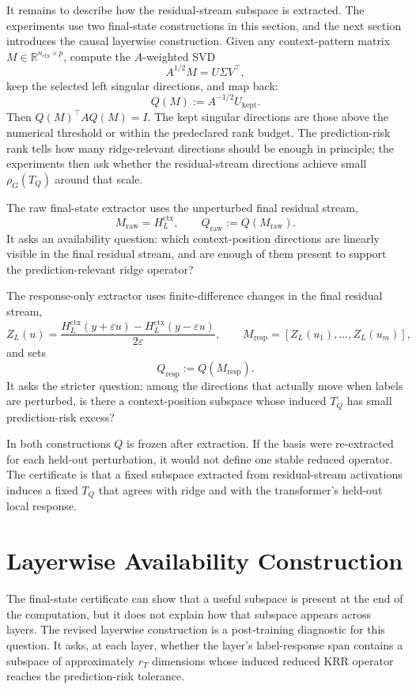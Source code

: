\documentclass[11pt]{article}
\newcommand{\R}{\mathbb{R}}
\begin{document}
It remains to describe how the residual-stream subspace is extracted. The experiments use two
final-state constructions in this section, and the next section introduces the causal layerwise
construction. Given any context-pattern
matrix \(M\in\R^{n_{\mathrm{ctx}}\times p}\), compute the \(A\)-weighted SVD
\[
A^{1/2}M=U\Sigma V^\top,
\]
keep the selected left singular directions, and map back:
\[
Q(M):=A^{-1/2}U_{\mathrm{kept}}.
\]
Then \(Q(M)^\top A Q(M)=I\). The kept singular directions are those above the numerical threshold
or within the predeclared rank budget. The prediction-risk rank tells how many ridge-relevant
directions should be enough in principle; the experiments then ask whether the residual-stream
directions achieve small \(\rho_G(T_Q)\) around that scale.

The raw final-state extractor uses the unperturbed final residual stream,
\[
M_{\mathrm{raw}}=H_L^{\mathrm{ctx}},
\qquad
Q_{\mathrm{raw}}:=Q(M_{\mathrm{raw}}).
\]
It asks an availability question: which context-position directions are linearly visible in the final
residual stream, and are enough of them present to support the prediction-relevant ridge operator?

The response-only extractor uses finite-difference changes in the final residual stream,
\[
Z_L(u)=
\frac{
H_L^{\mathrm{ctx}}(y+\varepsilon u)-H_L^{\mathrm{ctx}}(y-\varepsilon u)
}{2\varepsilon},
\qquad
M_{\mathrm{resp}}=[Z_L(u_1),\ldots,Z_L(u_m)],
\]
and sets
\[
Q_{\mathrm{resp}}:=Q(M_{\mathrm{resp}}).
\]
It asks the stricter question: among the directions that actually move when labels are perturbed,
is there a context-position subspace whose induced \(T_Q\) has small prediction-risk excess?

In both constructions \(Q\) is frozen after extraction. If the basis were re-extracted for each
held-out perturbation, it would not define one stable reduced operator. The certificate is that a
fixed subspace extracted from residual-stream activations induces a fixed \(T_Q\) that agrees with
ridge and with the transformer's held-out local response.

\section{Layerwise Availability Construction}

The final-state certificate can show that a useful subspace is present at the end of the computation,
but it does not explain how that subspace appears across layers. The revised layerwise construction
is a post-training diagnostic for this question. It asks, at each layer, whether the layer's
label-response span contains a subspace of approximately \(r_T\) dimensions whose induced reduced
KRR operator reaches the prediction-risk tolerance.
\end{document}
